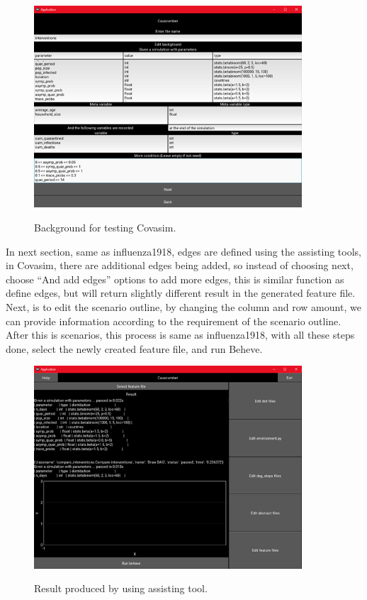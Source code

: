 \begin{figure}[H]
	\centering
	\includegraphics[width=10cm]{figures/CovasimTestProcess3.png}\\
	\caption{Background for testing Covasim.}
	\label{fig:figure36}
\end{figure}
\noindent 
In next section, same as influenza1918, edges are defined using the assisting tools, in Covasim, there are additional edges being added, so instead of choosing next, choose “And add edges” options to add more edges, this is similar function as define edges, but will return slightly different result in the generated feature file. Next, is to edit the scenario outline, by changing the column and row amount, we can provide information according to the requirement of the scenario outline. After this is scenarios, this process is same as influenza1918, with all these steps done, select the newly created feature file, and run Beheve.
\begin{figure}[H]
	\centering
	\includegraphics[width=10cm]{figures/CovasimTestProcess6.png}\\
	\caption{Result produced by using assisting tool.}
	\label{fig:figure39}
\end{figure}
\noindent 

